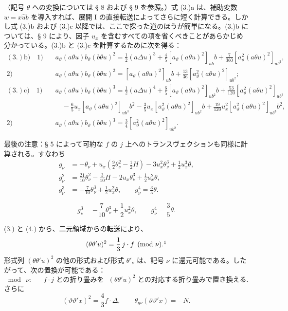 \documentclass[11pt]{article}
\newcommand{\A}{\Delta}
\begin{document}
（記号 $\theta$ への変換については § 8 および § 9 を参照。）式 (3.)a は、補助変数 $w=x\widehat{u}b$ を導入すれば、展開 I の直接転送によってさらに短く計算できる。しかし式 (3.)b および (3.)c 以降では、ここで採った道のほうが簡単になる。(3.)b については、§ 9 により、因子 $u_x$ を含むすべての項を省くべきことがあらかじめ分かっている。(3.)b と (3.)c を計算するために次を得る：
\[
\begin{aligned}
(3.)\mathrm{b)}\quad 1)&\quad a_\vartheta(a\theta u)b_\vartheta(b\theta u)^2=\frac12(a\Delta u)^3+\frac45[a_\vartheta(a\theta u)^2]_{ub}b+\frac7{360}[a_\vartheta^2(a\theta u)^2]_{ub^2},\\
2)&\quad a_\vartheta(a\theta u)b_\vartheta(b\theta u)^2=[a_\vartheta(a\theta u)^2]_{ub}b+\frac{13}{36}[a_\vartheta^2(a\theta u)^2]_{ub^2};\\[.5em]
(3.)\mathrm{c)}\quad 1)&\quad a_\vartheta(a\theta u)b_\vartheta(b\theta u)^3=\frac12(a\Delta u)^4+\frac65[a_\vartheta(a\theta u)^2]_{ub^2}b+\frac{53}{120}[a_\vartheta^2(a\theta u)^2]_{ub^3}\\
&\qquad-\frac65u_x[a_\vartheta(a\theta u)^2]_{ub^3}b^2-\frac35u_x[a_\vartheta^2(a\theta u)^2]_{ub^2}b+\frac{19}{120}u_x^2[a_\vartheta^2(a\theta u)^2]_{ub^3}b^2,\\
2)&\quad a_\vartheta(a\theta u)b_\vartheta(b\theta u)^3=\frac34[a_\vartheta^2(a\theta u)^2]_{ub^2}.
\end{aligned}
\]

最後の注意：§ 5 によって可約な $f$ の $j$ 上へのトランスヴェクションも同様に計算される。すなわち
\[
\tag{4}
\begin{aligned}
g_\nu&=-\theta_\nu+u_x\left(\frac92\theta_\nu^2-\frac12H\right)-3u_x^2\theta_\nu^3+\frac12u_x^3\theta,\\
g_\nu^2&=\frac{21}{10}\theta_\nu^2-\frac3{10}H-2u_x\theta_\nu^3+\frac12u_x^2\theta,\\
g_\nu^3&=-\frac7{10}\theta_\nu^3+\frac12u_x^2\theta,\qquad g_\nu^4=\frac35\theta.
\end{aligned}
\]

\[
\tag{4}
g_\nu^3=-\frac7{10}\theta_\nu^3+\frac12u_x^2\theta,
\qquad
g_\nu^4=\frac35\theta.
\]

(3.) と (4.) から、二元領域からの転送により、
\[
(\theta\theta'u)^2=\frac13\,j\cdot f\pmod{\nu}.\footnotemark
\]
形式列 $(\theta\theta'u)^2$ の他の形式および形式 $\theta'_\nu$ は、記号 $\nu$ に還元可能である。したがって、次の置換が可能である：
\[
\bmod\ \nu:\quad \text{ } f\cdot j\text{ との折り畳みを}
\text{ }(\theta\theta'u)^2\text{ との対応する折り畳みで置き換える}.
\]
さらに
\[
(\vartheta\vartheta'x)^2=\frac43 f\cdot\A,
\qquad
\theta_{g\nu}(\vartheta\vartheta'x)=-N.
\]
\end{document}
